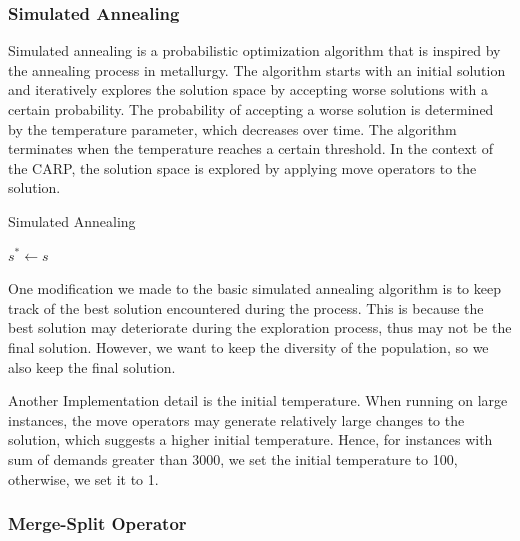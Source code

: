 \documentclass[conference]{IEEEtran}
\begin{document}
\subsubsection{Simulated Annealing}

Simulated annealing is a probabilistic optimization algorithm that is inspired by the annealing process in metallurgy.
The algorithm starts with an initial solution and iteratively explores the solution space by accepting worse solutions with a certain probability.
The probability of accepting a worse solution is determined by the temperature parameter, which decreases over time.
The algorithm terminates when the temperature reaches a certain threshold.
In the context of the CARP, the solution space is explored by applying move operators to the solution.

\begin{algorithm}
    \caption{Simulated Annealing}
    $s^* \leftarrow s$\;
\end{algorithm}

One modification we made to the basic simulated annealing algorithm is to keep track of the best solution encountered during the process.
This is because the best solution may deteriorate during the exploration process, thus may not be the final solution.
However, we want to keep the diversity of the population, so we also keep the final solution.

Another Implementation detail is the initial temperature.
When running on large instances, the move operators may generate relatively large changes to the solution, which suggests a higher initial temperature.
Hence, for instances with sum of demands greater than 3000, we set the initial temperature to 100, otherwise, we set it to 1.

\subsubsection{Merge-Split Operator}
\end{document}
